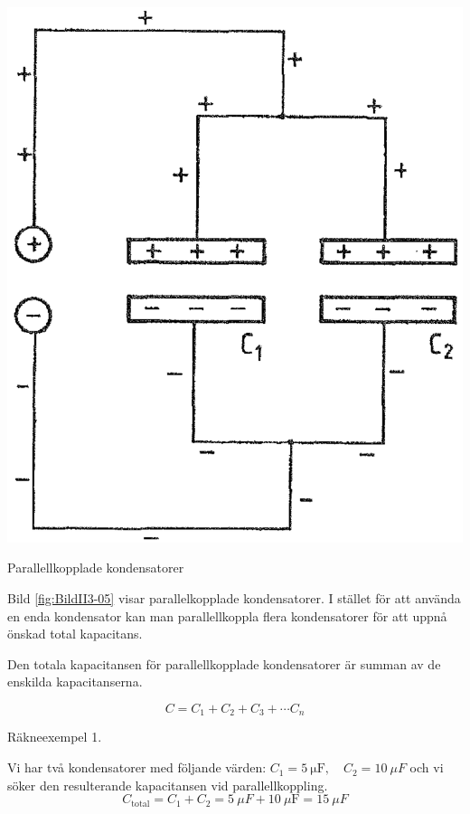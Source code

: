 \begin{marginfigure}%
  \includegraphics[width=\textwidth]{images/cropped_pdfs/bild_2_3-05.pdf}
  \caption{Parallellkopplade kondensatorer}
  \label{fig:BildII3-05}
\end{marginfigure}

Bild \ref{fig:BildII3-05} visar parallelkopplade kondensatorer.
I stället för att använda en enda kondensator kan man parallellkoppla flera
kondensatorer för att uppnå önskad total kapacitans.

Den totala kapacitansen för parallellkopplade kondensatorer är summan av de
enskilda kapacitanserna.

\[C = C_1 + C_2 + C_3 + \cdots C_n\]

\noindent Räkneexempel 1.

Vi har två kondensatorer med följande värden: \( C_1 =
\SI{5}{\micro\farad}, \quad C_2 = \SI{10}{\mu F} \) och vi söker den
resulterande kapacitansen vid parallellkoppling.
\[   C_{\text{total}} = C_1 + C_2 = \SI{5}{\mu F} +
     \SI{10}{\mu\farad} = \SI{15}{\mu F}   \]



